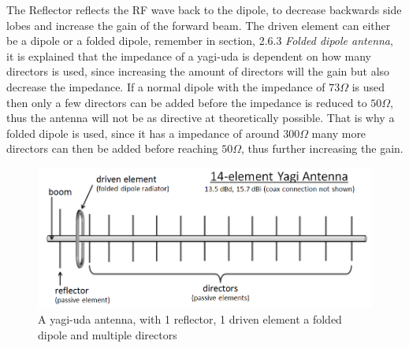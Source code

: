 The Reflector reflects the RF wave back to the dipole, to decrease backwards side lobes and increase the gain of the forward beam. The driven element can either be a dipole or a folded dipole, remember in section, 2.6.3 \textit{Folded dipole antenna}, it is explained that the impedance of a yagi-uda is dependent on how many directors is used, since increasing the amount of directors will the gain but also decrease the impedance. If a normal dipole with the impedance of $73\Omega$ is used then only a few directors can be added before the impedance is reduced to $50\Omega$, thus the antenna will not be as directive at theoretically possible. That is why a folded dipole is used, since it has a impedance of around $300\Omega$ many more directors can then be added before reaching $50\Omega$, thus further increasing the gain. 

\begin{figure}[h]
\centering
\includegraphics[scale=0.5]{figures/yagi-uda.png}
\caption{A yagi-uda antenna, with 1 reflector, 1 driven element a folded dipole and multiple directors\cite{YagiUda}}
\end{figure}






































